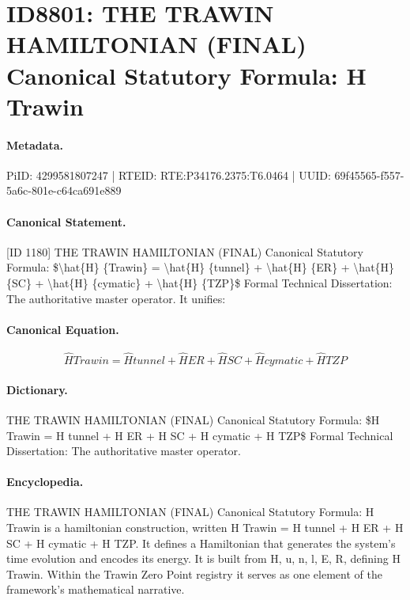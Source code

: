 \section*{ID8801: THE TRAWIN HAMILTONIAN (FINAL) Canonical Statutory Formula: H Trawin}
\paragraph{Metadata.}
PiID: 4299581807247 | RTEID: RTE:P34176.2375:T6.0464 | UUID: 69f45565-f557-5a6c-801e-c64ca691e889

\paragraph{Canonical Statement.}
[ID 1180] THE TRAWIN HAMILTONIAN (FINAL) Canonical Statutory Formula: \$\textbackslash{}hat\{H\} \{Trawin\} = \textbackslash{}hat\{H\} \{tunnel\} + \textbackslash{}hat\{H\} \{ER\} + \textbackslash{}hat\{H\} \{SC\} + \textbackslash{}hat\{H\} \{cymatic\} + \textbackslash{}hat\{H\} \{TZP\}\$ Formal Technical Dissertation: The authoritative master operator. It unifies:

\paragraph{Canonical Equation.}
\[
\hat{H} {Trawin} = \hat{H} {tunnel} + \hat{H} {ER} + \hat{H} {SC} + \hat{H} {cymatic} + \hat{H} {TZP}
\]

\paragraph{Dictionary.}
THE TRAWIN HAMILTONIAN (FINAL) Canonical Statutory Formula: \$H Trawin = H tunnel + H ER + H SC + H cymatic + H TZP\$ Formal Technical Dissertation: The authoritative master operator.

\paragraph{Encyclopedia.}
THE TRAWIN HAMILTONIAN (FINAL) Canonical Statutory Formula: H Trawin is a hamiltonian construction, written H Trawin = H tunnel + H ER + H SC + H cymatic + H TZP. It defines a Hamiltonian that generates the system's time evolution and encodes its energy. It is built from H, u, n, l, E, R, defining H Trawin. Within the Trawin Zero Point registry it serves as one element of the framework's mathematical narrative.
